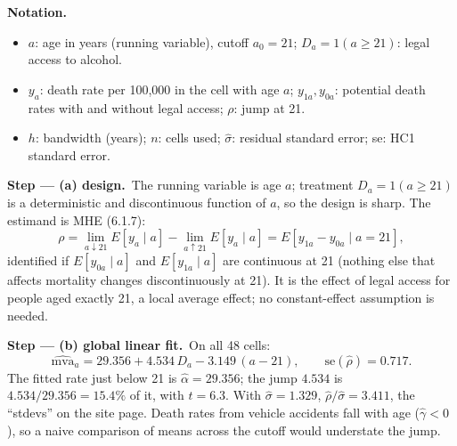 \documentclass[11pt,a4paper]{article}
\newenvironment{notacao}{\par\smallskip\noindent\textbf{Notation.}\begin{itemize}[leftmargin=1.4em,topsep=1pt,itemsep=0pt]\small}{\end{itemize}}
\newcommand{\passo}[2]{\par\smallskip\noindent\textbf{Step --- #1.}~#2}
\begin{document}
\begin{sol}
\begin{notacao}
\item $a$: age in years (running variable), cutoff $a_0=21$; $D_a=1(a\geq21)$: legal access to alcohol.
\item $y_a$: death rate per 100,000 in the cell with age $a$; $y_{1a},y_{0a}$: potential death rates with and
without legal access; $\rho$: jump at 21.
\item $h$: bandwidth (years); $n$: cells used; $\hat\sigma$: residual standard error; se: HC1 standard error.
\end{notacao}

\passo{(a) design}{The running variable is age $a$; treatment $D_a=1(a\geq21)$ is a deterministic and
discontinuous function of $a$, so the design is sharp. The estimand is MHE (6.1.7):
\begin{equation}
\rho=\lim_{a\downarrow21}E[y_a\mid a]-\lim_{a\uparrow21}E[y_a\mid a]=E[y_{1a}-y_{0a}\mid a=21],\label{q20:est}
\end{equation}
identified if $E[y_{0a}\mid a]$ and $E[y_{1a}\mid a]$ are continuous at 21 (nothing else that affects
mortality changes discontinuously at 21). It is the effect of legal access for people aged exactly 21,
a local average effect; no constant-effect assumption is needed.}

\passo{(b) global linear fit}{On all 48 cells:
\begin{equation}
\widehat{\text{mva}}_a=29.356+4.534\,D_a-3.149\,(a-21),\qquad \text{se}(\hat\rho)=0.717.\label{q20:lin}
\end{equation}
The fitted rate just below 21 is $\hat\alpha=29.356$; the jump $4.534$ is $4.534/29.356=15.4\%$ of it, with
$t=6.3$. With $\hat\sigma=1.329$, $\hat\rho/\hat\sigma=3.411$, the ``stdevs'' on the site page. Death rates
from vehicle accidents fall with age ($\hat\gamma<0$), so a naive comparison of means across the cutoff
would understate the jump.}


\end{sol}
\end{document}
